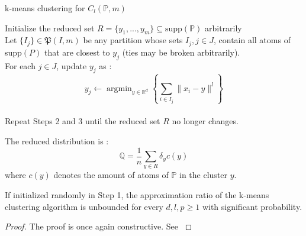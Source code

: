 \documentclass{amsart}
\newcommand{\argmin}{\mathop{\arg\min}}
\newcommand{\RR}{\mathbb{R}}
\begin{document}
\begin{algorithm}
    \caption{k-means clustering for $C_l\left(\mathbb{P},m\right)$}
    Initialize the reduced set $R=\{y_1,...,y_m\} \subseteq \text{supp}\left(\mathbb{P}\right)$ arbitrarily \\ Let $\{I_j\}\in\mathfrak{P}\left(I,m\right)$ be any partition whose sets $I_j, j\in J$, contain all atoms of supp$\left(P\right)$ that are closest to $y_j$ (ties may be broken arbitrarily). \\ For each $j\in J$, update $y_j$ as : $$y_j \gets \argmin_{y\in\RR^d} \left\{ \sum_{i\in I_j}\lVert x_i-y\rVert^l\right\}$$ \\ Repeat Steps 2 and 3 until the reduced set $R$ no longer changes.
\end{algorithm}
The reduced distribution is :
$$
\mathbb{Q}=\frac{1}{n}\sum_{y\in R}\delta_{y}c\left(y\right)
$$
where $ c\left(y\right)$ denotes the amount of atoms of $\mathbb{P}$ in the cluster $y$.
\begin{theorem}
    If initialized randomly in Step 1, the approximation ratio of the k-means clustering algorithm is unbounded for every $d,l,p\geq1$ with significant probability.
\end{theorem}
\begin{proof}
    The proof is once again constructive. See \cite[Theorem 8]{rujeerapaiboon_scenario_2022}
\end{proof}
\end{document}
